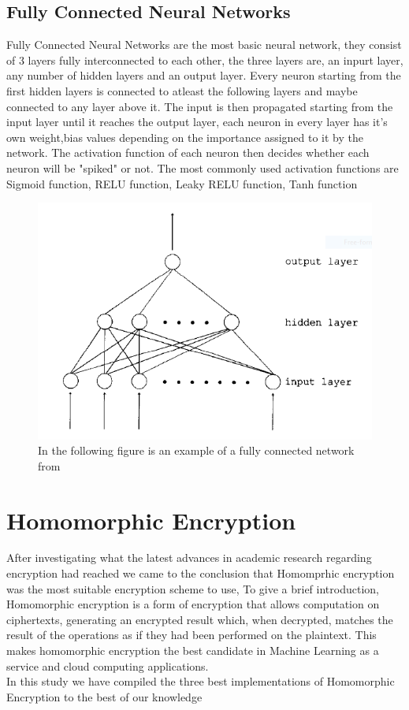 \subsection{Fully Connected Neural Networks}
Fully Connected Neural Networks are the most basic neural network, they consist of 3 layers fully interconnected to each other, the three layers are, an inpurt layer, any number of hidden layers and an output layer.
Every neuron starting from the first hidden layers is connected to atleast the following layers and maybe connected to any layer above it. The input is then propagated starting from the input layer until it reaches the output layer, each neuron in every layer has it's own weight,bias values depending on the importance assigned to it by the network.
The activation function of each neuron then decides whether each neuron will be "spiked" or not. The most commonly used activation functions are Sigmoid function, RELU function, Leaky RELU function, Tanh function
\begin{figure}[H]
    \centering
    \includegraphics[scale=0.75]{Capture}
    \caption{In the following figure is an example of a fully connected network from \cite{svozil1997introduction}}
    \label{fig:flow}
\end{figure}

\section{Homomorphic Encryption}
After investigating what the latest advances in academic research regarding encryption had reached we came to the conclusion that Homomprhic encryption was the most suitable encryption scheme to use,
To give a brief introduction, Homomorphic encryption is a form of encryption that allows computation on ciphertexts, generating an encrypted result which, when decrypted, matches the result of the operations as if they had been performed on the plaintext.
This makes homomorphic encryption the best candidate in Machine Learning as a service and cloud computing applications.\\
In this study we have compiled the three best implementations of Homomorphic Encryption to the best of our knowledge
